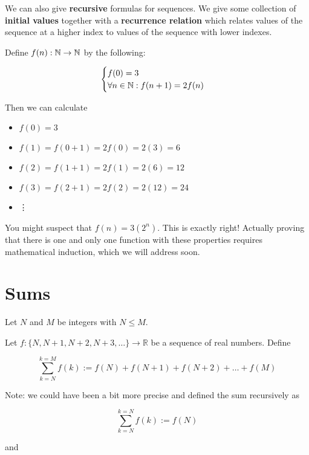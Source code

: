 We can also give  \textbf{recursive} formulas for sequences.   We give some collection of  \textbf{initial values} together with a  \textbf{recurrence relation} which relates values of the sequence at a higher index to values of the sequence with lower indexes.

\begin{example}
		Define $f(n): \mathbb{N} \to \mathbb{N}$ by the following:
		
		\[
		\begin{cases}
				f(0) = 3\\
				\forall n \in \mathbb{N}: f(n+1) = 2f(n) 
			\end{cases}
		\]
		
		Then we can calculate
		
		\begin{itemize}
		\item $f(0) = 3$
		\item $f(1) = f(0+1) = 2f(0) = 2(3) = 6$
		\item $f(2) = f(1+1) = 2f(1) = 2(6) = 12$
		\item $f(3) = f(2+1) = 2f(2) = 2(12) = 24$
		\item \vdots
		\end{itemize}
	
	You might suspect that $f(n) = 3(2^n)$.  This is exactly right!  Actually proving that there is one and only one function with these properties requires mathematical induction, which we will address soon.
	\end{example}

\section{Sums}

\begin{definition}
	Let $N$ and $M$ be integers with $N \leq M$.
	
	Let $f:  \{N, N+1, N+2, N+3, \dots\}\to \mathbb{R}$ be a sequence of real numbers.  Define 
	
	\[
\sum_{k=N}^{k=M} f(k) := f(N) + f(N+1) + f(N+2) + \dots + f(M)
\]

\end{definition}

Note:  we could have been a bit more precise and defined the sum recursively as 

\[
\sum_{k=N}^{k=N} f(k) := f(N)
\]

and

